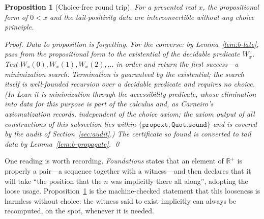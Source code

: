 \documentclass[11pt]{article}
\newtheorem{proposition}[theorem]{Proposition}
\theoremstyle{definition}
\theoremstyle{remark}
\begin{document}
\begin{proposition}[Choice-free round trip]
\label{prop:b-roundtrip}
For a presented real $x$, the propositional form of $0<x$ and the tail-positivity data are interconvertible without any choice principle.

\emph{Proof.}  Data to proposition is forgetting.  For the converse: by Lemma~\ref{lem:b-late}, pass from the propositional form to the existential of the decidable predicate $W_x$.  Test $W_x(0),W_x(1),W_x(2),\dots$ in order and return the first success---a \emph{minimization search}.  Termination is guaranteed by the existential; the search itself is well-founded recursion over a decidable predicate and requires no choice.  (In Lean it is minimization through the accessibility predicate, whose elimination into data for this purpose is part of the calculus and, as Carneiro's axiomatization records, independent of the choice axiom; the axiom output of all constructions of this subsection lies within $\{\texttt{propext},\texttt{Quot.sound}\}$ and is covered by the audit of Section~\ref{sec:audit}.)  The certificate so found is converted to tail data by Lemma~\ref{lem:b-propagate}. \qed
\end{proposition}

One reading is worth recording.  \emph{Foundations} states that an element of $\mathbb{R}^+$ is properly a pair---a sequence together with a witness---and then declares that it will take ``the position that the $n$ was implicitly there all along'', adopting the loose usage.  Proposition~\ref{prop:b-roundtrip} is the machine-checked statement that this looseness is harmless without choice: the witness said to exist implicitly can always be recomputed, on the spot, whenever it is needed.
\end{document}
